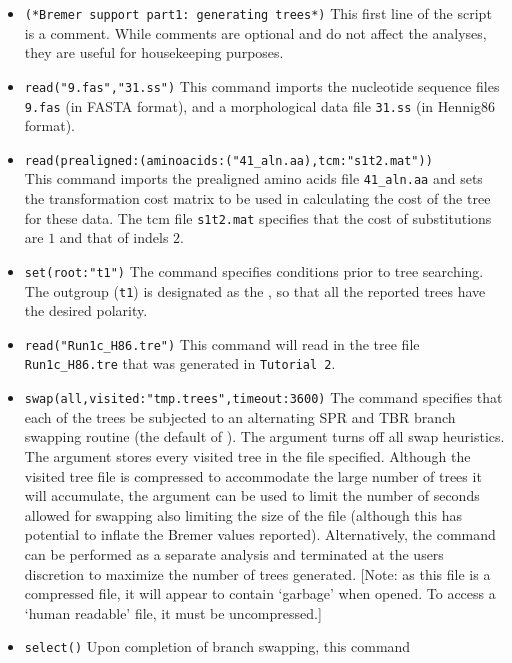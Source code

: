 \begin{itemize}
\item \texttt{(*Bremer support part1: generating trees*)} This first
line of the script is a comment. While comments
 are optional and do not affect the analyses, they are useful for
 housekeeping purposes.
\item \texttt{read("9.fas","31.ss")} This command imports the
nucleotide sequence files \texttt{9.fas} (in FASTA format), and a
morphological data file \texttt{31.ss} (in Hennig86 format).  
\item \texttt{read(prealigned:(aminoacids:("41\_aln.aa),tcm:"s1t2.mat"))}\\
This command imports the prealigned amino acids file \texttt{41\_aln.aa}
and sets the transformation cost matrix to be used in calculating
the cost of the tree for these data.  The tcm file \texttt{s1t2.mat}
specifies that the cost of substitutions are $1$ and that of indels
$2$.  
\item \texttt{set(root:"t1")} The  command
specifies conditions prior to tree searching. The outgroup (\texttt{t1})
is designated as the , so that all the reported
trees have the desired polarity.
\item \texttt{read("Run1c\_H86.tre")} This command will read in the 
tree file \texttt{Run1c\_H86.tre} that was generated in \texttt{Tutorial 2}.  
\item \texttt{swap(all,visited:"tmp.trees",timeout:3600)} The 
command specifies that each of the trees be subjected to an alternating
SPR and TBR branch swapping routine (the default of \poy).  The
 argument turns off all swap heuristics. The
 argument stores every visited
tree in the file specified.  Although the visited tree file is
compressed to accommodate the large number of trees it will accumulate,
the argument  can be used to limit the number
of seconds allowed for swapping also limiting the size of the file 
(although this has potential to inflate the Bremer values reported).
Alternatively,  the   command can be performed as
a separate analysis and terminated at the users discretion to
maximize the number of trees generated. [Note: as this
 file is a compressed file, it will appear 
to contain `garbage' when opened. To access a `human readable' 
file, it must be uncompressed.] 
\item \texttt{select()} Upon completion of branch swapping, this command

\end{itemize}

